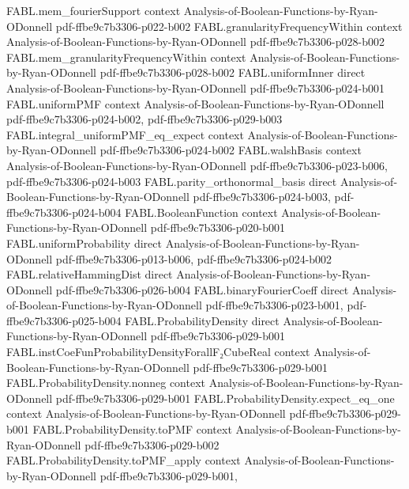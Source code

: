 \begin{theorem}
\proofstep
  {FABL.mem_fourierSupport}
  {context}
  {Analysis-of-Boolean-Functions-by-Ryan-ODonnell}
  {pdf-ffbe9c7b3306-p022-b002}
\proofstep
  {FABL.granularityFrequencyWithin}
  {context}
  {Analysis-of-Boolean-Functions-by-Ryan-ODonnell}
  {pdf-ffbe9c7b3306-p028-b002}
\proofstep
  {FABL.mem_granularityFrequencyWithin}
  {context}
  {Analysis-of-Boolean-Functions-by-Ryan-ODonnell}
  {pdf-ffbe9c7b3306-p028-b002}
\proofstep
  {FABL.uniformInner}
  {direct}
  {Analysis-of-Boolean-Functions-by-Ryan-ODonnell}
  {pdf-ffbe9c7b3306-p024-b001}
\proofstep
  {FABL.uniformPMF}
  {context}
  {Analysis-of-Boolean-Functions-by-Ryan-ODonnell}
  {pdf-ffbe9c7b3306-p024-b002,
    pdf-ffbe9c7b3306-p029-b003}
\proofstep
  {FABL.integral_uniformPMF_eq_expect}
  {context}
  {Analysis-of-Boolean-Functions-by-Ryan-ODonnell}
  {pdf-ffbe9c7b3306-p024-b002}
\proofstep
  {FABL.walshBasis}
  {context}
  {Analysis-of-Boolean-Functions-by-Ryan-ODonnell}
  {pdf-ffbe9c7b3306-p023-b006,
    pdf-ffbe9c7b3306-p024-b003}
\proofstep
  {FABL.parity_orthonormal_basis}
  {direct}
  {Analysis-of-Boolean-Functions-by-Ryan-ODonnell}
  {pdf-ffbe9c7b3306-p024-b003,
    pdf-ffbe9c7b3306-p024-b004}
\proofstep
  {FABL.BooleanFunction}
  {context}
  {Analysis-of-Boolean-Functions-by-Ryan-ODonnell}
  {pdf-ffbe9c7b3306-p020-b001}
\proofstep
  {FABL.uniformProbability}
  {direct}
  {Analysis-of-Boolean-Functions-by-Ryan-ODonnell}
  {pdf-ffbe9c7b3306-p013-b006,
    pdf-ffbe9c7b3306-p024-b002}
\proofstep
  {FABL.relativeHammingDist}
  {direct}
  {Analysis-of-Boolean-Functions-by-Ryan-ODonnell}
  {pdf-ffbe9c7b3306-p026-b004}
\proofstep
  {FABL.binaryFourierCoeff}
  {direct}
  {Analysis-of-Boolean-Functions-by-Ryan-ODonnell}
  {pdf-ffbe9c7b3306-p023-b001,
    pdf-ffbe9c7b3306-p025-b004}
\proofstep
  {FABL.ProbabilityDensity}
  {direct}
  {Analysis-of-Boolean-Functions-by-Ryan-ODonnell}
  {pdf-ffbe9c7b3306-p029-b001}
\proofstep
  {FABL.instCoeFunProbabilityDensityForallF₂CubeReal}
  {context}
  {Analysis-of-Boolean-Functions-by-Ryan-ODonnell}
  {pdf-ffbe9c7b3306-p029-b001}
\proofstep
  {FABL.ProbabilityDensity.nonneg}
  {context}
  {Analysis-of-Boolean-Functions-by-Ryan-ODonnell}
  {pdf-ffbe9c7b3306-p029-b001}
\proofstep
  {FABL.ProbabilityDensity.expect_eq_one}
  {context}
  {Analysis-of-Boolean-Functions-by-Ryan-ODonnell}
  {pdf-ffbe9c7b3306-p029-b001}
\proofstep
  {FABL.ProbabilityDensity.toPMF}
  {context}
  {Analysis-of-Boolean-Functions-by-Ryan-ODonnell}
  {pdf-ffbe9c7b3306-p029-b002}
\proofstep
  {FABL.ProbabilityDensity.toPMF_apply}
  {context}
  {Analysis-of-Boolean-Functions-by-Ryan-ODonnell}
  {pdf-ffbe9c7b3306-p029-b001,
}
\end{theorem}
